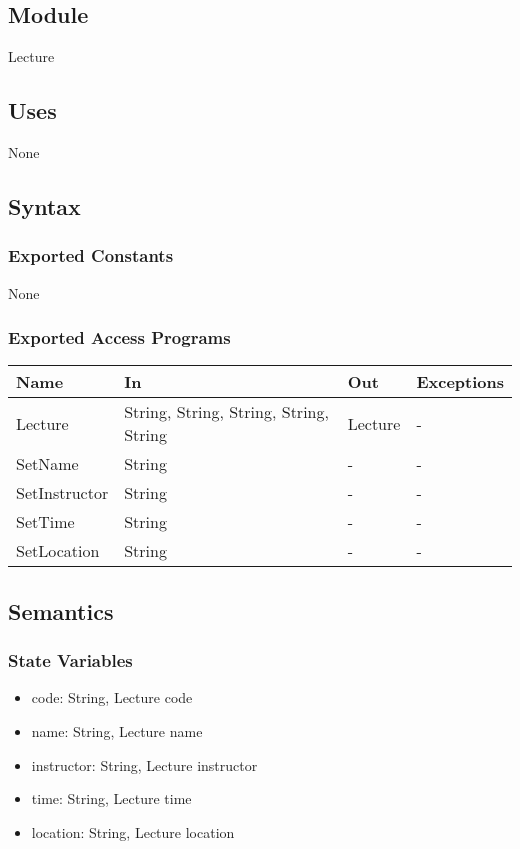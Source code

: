 \documentclass[12pt, titlepage]{article}
\begin{document}
\subsection{Module}

Lecture

\subsection{Uses}

None

\subsection{Syntax}

\subsubsection{Exported Constants}
None

\subsubsection{Exported Access Programs}
\begin{center}
\begin{tabular}{p{4cm} p{2cm} p{4cm} p{4cm}}
\hline
\textbf{Name} & \textbf{In} & \textbf{Out} & \textbf{Exceptions} \\
\hline
Lecture & String, String, String, String, String & Lecture & -\\
SetName & String & - & -\\
SetInstructor & String & - & -\\
SetTime & String & - & -\\
SetLocation & String & - & -\\
\hline
\end{tabular}
\end{center}

\subsection{Semantics}

\subsubsection{State Variables}

\begin{itemize}
\item code: String, Lecture code
\item name: String, Lecture name
\item instructor: String, Lecture instructor
\item time: String, Lecture time
\item location: String, Lecture location
\end{itemize}
\end{document}
